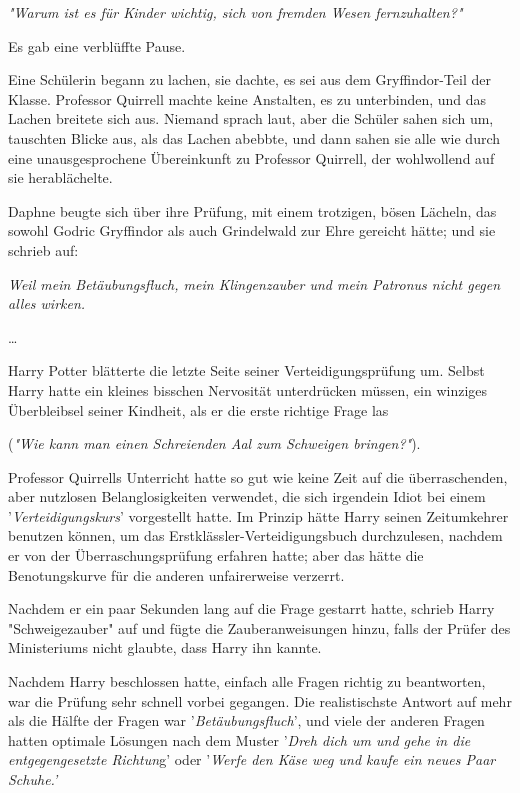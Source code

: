 {\emph{"Warum ist es für Kinder wichtig, sich von fremden Wesen fernzuhalten?"}

Es gab eine verblüffte Pause.

Eine Schülerin begann zu lachen, sie dachte, es sei aus dem Gryffindor-Teil der Klasse. Professor Quirrell machte keine Anstalten, es zu unterbinden, und das Lachen breitete sich aus. Niemand sprach laut, aber die Schüler sahen sich um, tauschten Blicke aus, als das Lachen abebbte, und dann sahen sie alle wie durch eine unausgesprochene Übereinkunft zu Professor Quirrell, der wohlwollend auf sie herablächelte.

Daphne beugte sich über ihre Prüfung, mit einem trotzigen, bösen Lächeln, das sowohl Godric Gryffindor als auch Grindelwald zur Ehre gereicht hätte; und sie schrieb auf:

\emph{Weil mein Betäubungsfluch, mein Klingenzauber und mein Patronus nicht gegen alles wirken.}

…

Harry Potter blätterte die letzte Seite seiner Verteidigungsprüfung um. Selbst Harry hatte ein kleines bisschen Nervosität unterdrücken müssen, ein winziges Überbleibsel seiner Kindheit, als er die erste richtige Frage las

(\emph{"Wie kann man einen Schreienden Aal zum Schweigen bringen?"}).

Professor Quirrells Unterricht hatte so gut wie keine Zeit auf die überraschenden, aber nutzlosen Belanglosigkeiten verwendet, die sich irgendein Idiot bei einem '\emph{Verteidigungskurs}' vorgestellt hatte. Im Prinzip hätte Harry seinen Zeitumkehrer benutzen können, um das Erstklässler-Verteidigungsbuch durchzulesen, nachdem er von der Überraschungsprüfung erfahren hatte; aber das hätte die Benotungskurve für die anderen unfairerweise verzerrt.

Nachdem er ein paar Sekunden lang auf die Frage gestarrt hatte, schrieb Harry "Schweigezauber" auf und fügte die Zauberanweisungen hinzu, falls der Prüfer des Ministeriums nicht glaubte, dass Harry ihn kannte.

Nachdem Harry beschlossen hatte, einfach alle Fragen richtig zu beantworten, war die Prüfung sehr schnell vorbei gegangen. Die realistischste Antwort auf mehr als die Hälfte der Fragen war '\emph{Betäubungsfluch}', und viele der anderen Fragen hatten optimale Lösungen nach dem Muster '\emph{Dreh dich um und gehe in die entgegengesetzte Richtun}g' oder '\emph{Werfe den Käse weg und kaufe ein neues Paar Schuhe.'}

}
